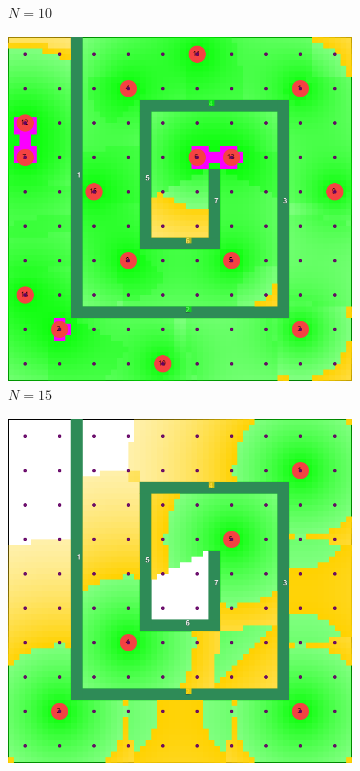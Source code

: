 \documentclass[conference]{IEEEtran}
\begin{document}
\begin{figure}[t]
\begin{subfigure}[t]{0.10\textwidth}
        \caption{$N=10$}
    \end{subfigure}\hfill
    \begin{subfigure}[t]{0.10\textwidth}
        \centering
        \includegraphics[width=\textwidth]{Figures/Maze4_3.png}
        \caption{$N=15$}
    \end{subfigure}
    \hspace{5mm}
    \begin{subfigure}[t]{0.10\textwidth}
        \centering
        \includegraphics[width=\textwidth]{Figures/Maze1_1.png}

\end{subfigure}
\end{figure}
\end{document}
